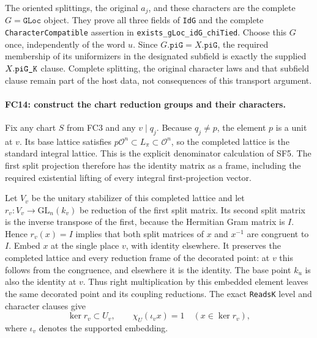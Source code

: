 \documentclass[11pt,a4paper]{article}
\numberwithin{equation}{section}
\theoremstyle{remark}\newtheorem{remark}[theorem]{Remark}
\begin{document}
The oriented splittings, the original $a_j$, and these characters are
the complete $G=\texttt{GLoc}$ object. They prove all three fields of
\texttt{IdG} and the complete \texttt{CharacterCompatible} assertion
in \texttt{exists\_\allowbreak gLoc\_\allowbreak idG\_\allowbreak chiTied}. Choose this $G$ once,
independently of the word $u$. Since $G.\texttt{piG}=X.\texttt{piG}$,
the required membership of its uniformizers in the designated subfield
is exactly the supplied $X.\texttt{piG\_\allowbreak K}$ clause. Complete splitting,
the original character laws and that subfield clause remain part of
the host data, not consequences of this transport argument.

\paragraph{FC14: construct the chart reduction groups and their
characters.}
Fix any chart $S$ from FC3 and any $v\mid q_j$.
Because $q_j\ne p$, the element $p$ is a unit at $v$. Its base
lattice satisfies
$p\mathcal O^n\subset L_\pi\subset\mathcal O^n$, so the
completed lattice is the standard integral lattice. This is the explicit
denominator calculation of SF5. The first split projection therefore has
the identity matrix as a frame, including the required existential
lifting of every integral first-projection vector.

Let $V_v$ be the unitary stabilizer of this completed lattice and let
$r_v:V_v\to\mathrm{GL}_n(k_v)$ be reduction of the first split
matrix. Its second split matrix is the inverse transpose of the first,
because the Hermitian Gram matrix is $I$. Hence $r_v(x)=I$ implies
that both split matrices of $x$ and $x^{-1}$ are congruent to $I$.
Embed $x$ at the single place $v$, with identity elsewhere. It preserves
the completed lattice and every reduction frame of the decorated point:
at $v$ this follows from the congruence, and elsewhere it is the identity.
The base point $k_u$ is also the identity at $v$.
Thus right multiplication by this embedded element leaves the same
decorated point and its coupling reductions. The exact \texttt{ReadsK}
level and character clauses give
\[
 \ker r_v\subset U_v,\qquad
 \chi_U(\iota_v x)=1\quad(x\in\ker r_v),             \tag{FC.26}
\]
where $\iota_v$ denotes the supported embedding.
\end{document}
